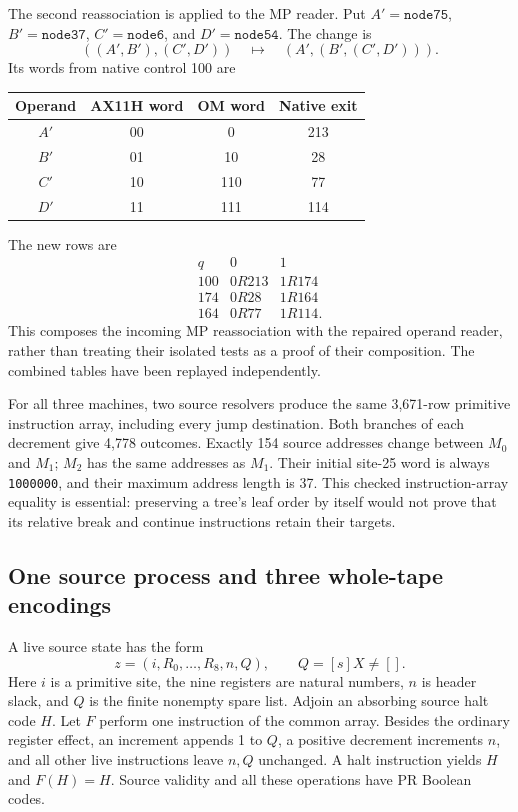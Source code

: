 The second reassociation is applied to the MP reader.  Put
$A'=\texttt{node75}$, $B'=\texttt{node37}$,
$C'=\texttt{node6}$, and $D'=\texttt{node54}$.  The change is
\[
       ((A',B'),(C',D'))\quad\longmapsto\quad
                  (A',(B',(C',D'))).                         \tag{OM4}
\]
Its words from native control 100 are
\begin{center}
\begin{tabular}{cccc}
\toprule
Operand&AX11H word&OM word&Native exit\\\midrule
$A'$&00&0&213\\
$B'$&01&10&28\\
$C'$&10&110&77\\
$D'$&11&111&114\\\bottomrule
\end{tabular}
\end{center}
The new rows are
\[
\begin{array}{c|cc}
q&0&1\\\hline
100&0R213&1R174\\
174&0R28&1R164\\
164&0R77&1R114.
\end{array}                                                  \tag{OM5}
\]
This composes the incoming MP reassociation with the repaired operand
reader, rather than treating their isolated tests as a proof of their
composition.  The combined tables have been replayed independently.

For all three machines, two source resolvers produce the same 3,671-row
primitive instruction array, including every jump destination.  Both
branches of each decrement give 4,778 outcomes.  Exactly 154 source
addresses change between $M_0$ and $M_1$; $M_2$ has the same addresses as
$M_1$.  Their initial site-25 word is always \texttt{1000000}, and their
maximum address length is 37.  This checked instruction-array equality is
essential: preserving a tree's leaf order by itself would not prove that
its relative break and continue instructions retain their targets.

\subsection{One source process and three whole-tape encodings}

A live source state has the form
\[
       z=(i,R_0,\ldots,R_8,n,Q),\qquad Q=[s]X\ne[].
\]
Here $i$ is a primitive site, the nine registers are natural numbers,
$n$ is header slack, and $Q$ is the finite nonempty spare list.
Adjoin an absorbing source halt code $H$.  Let $F$ perform one instruction
of the common array.  Besides the ordinary register effect, an increment
appends 1 to $Q$, a positive decrement increments $n$, and all other live
instructions leave $n,Q$ unchanged.  A halt instruction yields $H$ and
$F(H)=H$.  Source validity and all these operations have PR Boolean codes.


